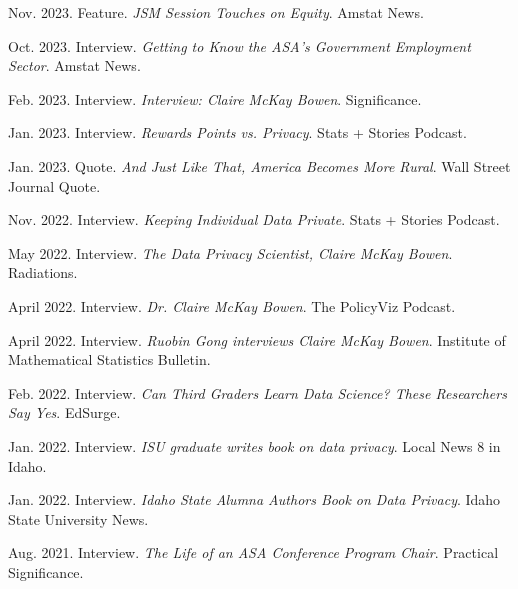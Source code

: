 \begin{etaremune}[topsep=0pt, itemsep=3pt, partopsep=0pt, parsep=0pt]

    \item Nov. 2023. Feature. \textit{JSM Session Touches on Equity}. Amstat News.
    
    \item Oct. 2023. Interview. \textit{Getting to Know the ASA's Government Employment Sector}. Amstat News.
    
    \item Feb. 2023. Interview. \textit{Interview: Claire McKay Bowen}. Significance.
    
    \item Jan. 2023. Interview. \textit{Rewards Points vs. Privacy}. Stats + Stories Podcast.
    
    \item Jan. 2023. Quote. \textit{And Just Like That, America Becomes More Rural}. Wall Street Journal Quote.
    
    \item Nov. 2022. Interview. \textit{Keeping Individual Data Private}. Stats + Stories Podcast.
    
    \item May 2022. Interview. \textit{The Data Privacy Scientist, Claire McKay Bowen}. Radiations.
    
    \item April 2022. Interview. \textit{Dr. Claire McKay Bowen}. The PolicyViz Podcast.
    
    \item April 2022. Interview. \textit{Ruobin Gong interviews Claire McKay Bowen}. Institute of Mathematical Statistics Bulletin.
    
    \item Feb. 2022. Interview. \textit{Can Third Graders Learn Data Science? These Researchers Say Yes}. EdSurge.
    
    \item Jan. 2022. Interview. \textit{ISU graduate writes book on data privacy}. Local News 8 in Idaho.
    
    \item Jan. 2022. Interview. \textit{Idaho State Alumna Authors Book on Data Privacy}. Idaho State University News.

    \item Aug. 2021. Interview. \textit{The Life of an ASA Conference Program Chair}. Practical Significance.    


\end{etaremune}
